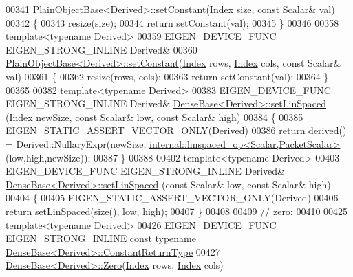 \begin{DoxyCode}
00341 \hyperlink{class_eigen_1_1_plain_object_base_ac8dea1df3d92b752cc683ff42abf6f9b}{PlainObjectBase<Derived>::setConstant}(\hyperlink{namespace_eigen_a62e77e0933482dafde8fe197d9a2cfde}{Index} size, \textcolor{keyword}{const} Scalar& 
      val)
00342 \{
00343   resize(size);
00344   \textcolor{keywordflow}{return} setConstant(val);
00345 \}
00346 
00358 \textcolor{keyword}{template}<\textcolor{keyword}{typename} Derived>
00359 EIGEN\_DEVICE\_FUNC EIGEN\_STRONG\_INLINE Derived&
00360 \hyperlink{class_eigen_1_1_plain_object_base_ac8dea1df3d92b752cc683ff42abf6f9b}{PlainObjectBase<Derived>::setConstant}(\hyperlink{namespace_eigen_a62e77e0933482dafde8fe197d9a2cfde}{Index} rows, 
      \hyperlink{namespace_eigen_a62e77e0933482dafde8fe197d9a2cfde}{Index} cols, \textcolor{keyword}{const} Scalar& val)
00361 \{
00362   resize(rows, cols);
00363   \textcolor{keywordflow}{return} setConstant(val);
00364 \}
00365 
00382 \textcolor{keyword}{template}<\textcolor{keyword}{typename} Derived>
00383 EIGEN\_DEVICE\_FUNC EIGEN\_STRONG\_INLINE Derived& \hyperlink{group___core___module_a17a69cfd1b44b64f26b1a0f00666a871}{DenseBase<Derived>::setLinSpaced}
      (\hyperlink{namespace_eigen_a62e77e0933482dafde8fe197d9a2cfde}{Index} newSize, \textcolor{keyword}{const} Scalar& low, \textcolor{keyword}{const} Scalar& high)
00384 \{
00385   EIGEN\_STATIC\_ASSERT\_VECTOR\_ONLY(Derived)
00386   \textcolor{keywordflow}{return} derived() = Derived::NullaryExpr(newSize, 
      \hyperlink{struct_eigen_1_1internal_1_1linspaced__op}{internal::linspaced\_op<Scalar,PacketScalar>}(low,high,newSize));
00387 \}
00388 
00402 \textcolor{keyword}{template}<\textcolor{keyword}{typename} Derived>
00403 EIGEN\_DEVICE\_FUNC EIGEN\_STRONG\_INLINE Derived& \hyperlink{group___core___module_a17a69cfd1b44b64f26b1a0f00666a871}{DenseBase<Derived>::setLinSpaced}
      (\textcolor{keyword}{const} Scalar& low, \textcolor{keyword}{const} Scalar& high)
00404 \{
00405   EIGEN\_STATIC\_ASSERT\_VECTOR\_ONLY(Derived)
00406   \textcolor{keywordflow}{return} setLinSpaced(size(), low, high);
00407 \}
00408 
00409 \textcolor{comment}{// zero:}
00410 
00425 \textcolor{keyword}{template}<\textcolor{keyword}{typename} Derived>
00426 EIGEN\_DEVICE\_FUNC EIGEN\_STRONG\_INLINE \textcolor{keyword}{const} \textcolor{keyword}{typename} 
      \hyperlink{group___core___module_class_eigen_1_1_cwise_nullary_op}{DenseBase<Derived>::ConstantReturnType}
00427 \hyperlink{group___core___module_a8c4be762b10041d64a2b2ce85bb14ba0}{DenseBase<Derived>::Zero}(\hyperlink{namespace_eigen_a62e77e0933482dafde8fe197d9a2cfde}{Index} rows, \hyperlink{namespace_eigen_a62e77e0933482dafde8fe197d9a2cfde}{Index} cols)

\end{DoxyCode}

